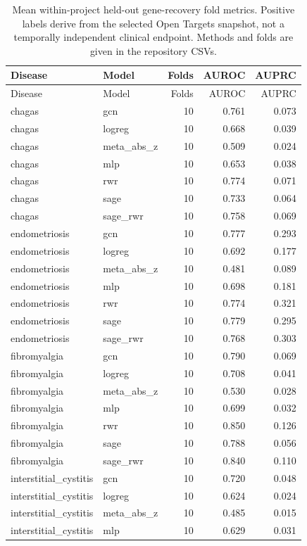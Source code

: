 \begin{longtable}{llrrr}
\caption{Mean within-project held-out gene-recovery fold metrics. Positive labels derive from the selected Open Targets snapshot, not a temporally independent clinical endpoint. Methods and folds are given in the repository CSVs.}\label{tab:gene}\\
\hline Disease & Model & Folds & AUROC & AUPRC\\\hline\endfirsthead
\hline Disease & Model & Folds & AUROC & AUPRC\\\hline\endhead
chagas & gcn & 10 & 0.761 & 0.073\\
chagas & logreg & 10 & 0.668 & 0.039\\
chagas & meta\_abs\_z & 10 & 0.509 & 0.024\\
chagas & mlp & 10 & 0.653 & 0.038\\
chagas & rwr & 10 & 0.774 & 0.071\\
chagas & sage & 10 & 0.733 & 0.064\\
chagas & sage\_rwr & 10 & 0.758 & 0.069\\
endometriosis & gcn & 10 & 0.777 & 0.293\\
endometriosis & logreg & 10 & 0.692 & 0.177\\
endometriosis & meta\_abs\_z & 10 & 0.481 & 0.089\\
endometriosis & mlp & 10 & 0.698 & 0.181\\
endometriosis & rwr & 10 & 0.774 & 0.321\\
endometriosis & sage & 10 & 0.779 & 0.295\\
endometriosis & sage\_rwr & 10 & 0.768 & 0.303\\
fibromyalgia & gcn & 10 & 0.790 & 0.069\\
fibromyalgia & logreg & 10 & 0.708 & 0.041\\
fibromyalgia & meta\_abs\_z & 10 & 0.530 & 0.028\\
fibromyalgia & mlp & 10 & 0.699 & 0.032\\
fibromyalgia & rwr & 10 & 0.850 & 0.126\\
fibromyalgia & sage & 10 & 0.788 & 0.056\\
fibromyalgia & sage\_rwr & 10 & 0.840 & 0.110\\
interstitial\_cystitis & gcn & 10 & 0.720 & 0.048\\
interstitial\_cystitis & logreg & 10 & 0.624 & 0.024\\
interstitial\_cystitis & meta\_abs\_z & 10 & 0.485 & 0.015\\
interstitial\_cystitis & mlp & 10 & 0.629 & 0.031\\

\end{longtable}
